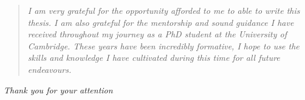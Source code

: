 \pagebreak

\hspace{0pt}
\vspace*{\fill}
\begin{quote}\emph{
I am very grateful for the opportunity afforded to me to able to write this thesis.
I am also grateful for the mentorship and sound guidance I have received throughout my journey as a PhD student at the University of Cambridge.
These years have been incredibly formative, I hope to use the skills and knowledge I have cultivated during this time for all future endeavours.%
}
\end{quote}
\mbox{}\hfill \emph{Thank you for your attention}
\vspace*{\fill}
\hspace{0pt}
\nocite{bairdFrontalLobeActivation2002}
\nocite{simmonsKissMakeUp2002}

